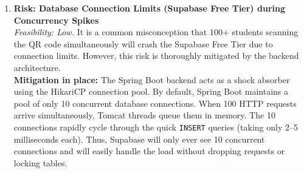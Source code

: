 \documentclass[11pt,a4paper]{article}
\begin{document}
\begin{enumerate}
    \item \textbf{Risk: Database Connection Limits (Supabase Free Tier) during Concurrency Spikes}\\
    \textit{Feasibility: Low.} It is a common misconception that 100+ students scanning the QR code simultaneously will crash the Supabase Free Tier due to connection limits. However, this risk is thoroughly mitigated by the backend architecture. \\
    \textbf{Mitigation in place:} The Spring Boot backend acts as a shock absorber using the HikariCP connection pool. By default, Spring Boot maintains a pool of only 10 concurrent database connections. When 100 HTTP requests arrive simultaneously, Tomcat threads queue them in memory. The 10 connections rapidly cycle through the quick \texttt{INSERT} queries (taking only 2--5 milliseconds each). Thus, Supabase will only ever see 10 concurrent connections and will easily handle the load without dropping requests or locking tables.
\end{enumerate}
\end{document}
